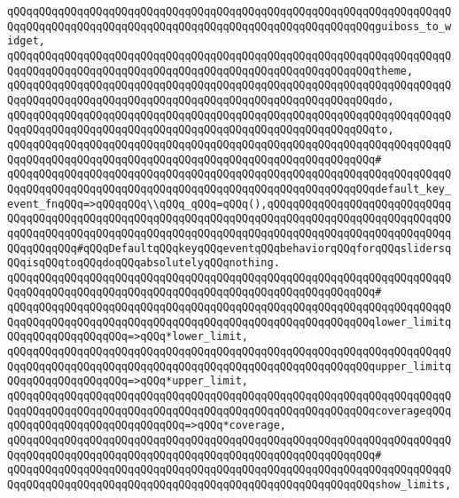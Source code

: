 \verb|qQQqqQQqqQQqqQQqqQQqqQQqqQQqqQQqqQQqqQQqqQQqqQQqqQQqqQQqqQQqqQQqqQQqqQQqqQQqqQQqqQQqqQQqqQQqqQQqqQQqqQQqqQQqqQQqqQQqqQQqqQQqqQQqguiboss_to_widget,|\newline
\verb|qQQqqQQqqQQqqQQqqQQqqQQqqQQqqQQqqQQqqQQqqQQqqQQqqQQqqQQqqQQqqQQqqQQqqQQqqQQqqQQqqQQqqQQqqQQqqQQqqQQqqQQqqQQqqQQqqQQqqQQqqQQqqQQqtheme,|\newline
\verb|qQQqqQQqqQQqqQQqqQQqqQQqqQQqqQQqqQQqqQQqqQQqqQQqqQQqqQQqqQQqqQQqqQQqqQQqqQQqqQQqqQQqqQQqqQQqqQQqqQQqqQQqqQQqqQQqqQQqqQQqqQQqqQQqdo,|\newline
\verb|qQQqqQQqqQQqqQQqqQQqqQQqqQQqqQQqqQQqqQQqqQQqqQQqqQQqqQQqqQQqqQQqqQQqqQQqqQQqqQQqqQQqqQQqqQQqqQQqqQQqqQQqqQQqqQQqqQQqqQQqqQQqqQQqto,|\newline
\verb|qQQqqQQqqQQqqQQqqQQqqQQqqQQqqQQqqQQqqQQqqQQqqQQqqQQqqQQqqQQqqQQqqQQqqQQqqQQqqQQqqQQqqQQqqQQqqQQqqQQqqQQqqQQqqQQqqQQqqQQqqQQqqQQq#|\newline
\verb|qQQqqQQqqQQqqQQqqQQqqQQqqQQqqQQqqQQqqQQqqQQqqQQqqQQqqQQqqQQqqQQqqQQqqQQqqQQqqQQqqQQqqQQqqQQqqQQqqQQqqQQqqQQqqQQqqQQqqQQqqQQqqQQqdefault_key_event_fnqQQq=>qQQqqQQq\\qQQq_qQQq=qQQq(),qQQqqQQqqQQqqQQqqQQqqQQqqQQqqQQqqQQqqQQqqQQqqQQqqQQqqQQqqQQqqQQqqQQqqQQqqQQqqQQqqQQqqQQqqQQqqQQqqQQqqQQqqQQqqQQqqQQqqQQqqQQqqQQqqQQqqQQqqQQqqQQqqQQqqQQqqQQqqQQqqQQqqQQqqQQqqQQqqQQq#qQQqDefaultqQQqkeyqQQqeventqQQqbehaviorqQQqforqQQqslidersqQQqisqQQqtoqQQqdoqQQqabsolutelyqQQqnothing.|\newline
\verb|qQQqqQQqqQQqqQQqqQQqqQQqqQQqqQQqqQQqqQQqqQQqqQQqqQQqqQQqqQQqqQQqqQQqqQQqqQQqqQQqqQQqqQQqqQQqqQQqqQQqqQQqqQQqqQQqqQQqqQQqqQQqqQQq#|\newline
\verb|qQQqqQQqqQQqqQQqqQQqqQQqqQQqqQQqqQQqqQQqqQQqqQQqqQQqqQQqqQQqqQQqqQQqqQQqqQQqqQQqqQQqqQQqqQQqqQQqqQQqqQQqqQQqqQQqqQQqqQQqqQQqqQQqlower_limitqQQqqQQqqQQqqQQqqQQq=>qQQq*lower_limit,|\newline
\verb|qQQqqQQqqQQqqQQqqQQqqQQqqQQqqQQqqQQqqQQqqQQqqQQqqQQqqQQqqQQqqQQqqQQqqQQqqQQqqQQqqQQqqQQqqQQqqQQqqQQqqQQqqQQqqQQqqQQqqQQqqQQqqQQqupper_limitqQQqqQQqqQQqqQQqqQQq=>qQQq*upper_limit,|\newline
\verb|qQQqqQQqqQQqqQQqqQQqqQQqqQQqqQQqqQQqqQQqqQQqqQQqqQQqqQQqqQQqqQQqqQQqqQQqqQQqqQQqqQQqqQQqqQQqqQQqqQQqqQQqqQQqqQQqqQQqqQQqqQQqqQQqcoverageqQQqqQQqqQQqqQQqqQQqqQQqqQQqqQQq=>qQQq*coverage,|\newline
\verb|qQQqqQQqqQQqqQQqqQQqqQQqqQQqqQQqqQQqqQQqqQQqqQQqqQQqqQQqqQQqqQQqqQQqqQQqqQQqqQQqqQQqqQQqqQQqqQQqqQQqqQQqqQQqqQQqqQQqqQQqqQQqqQQq#|\newline
\verb|qQQqqQQqqQQqqQQqqQQqqQQqqQQqqQQqqQQqqQQqqQQqqQQqqQQqqQQqqQQqqQQqqQQqqQQqqQQqqQQqqQQqqQQqqQQqqQQqqQQqqQQqqQQqqQQqqQQqqQQqqQQqqQQqshow_limits,|\newline
